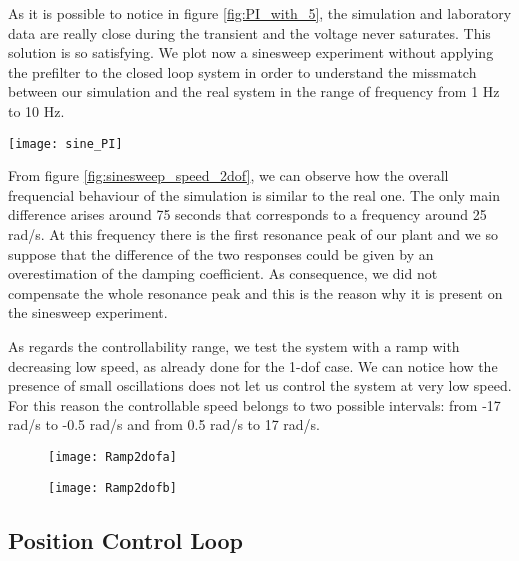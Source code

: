 As it is possible to notice in figure \ref{fig:PI_with_5}, the simulation and laboratory data are really close during the transient and the voltage never saturates. This solution is so satisfying. We plot now a sinesweep experiment without applying the prefilter to the closed loop system in order to understand the missmatch between our simulation and the real system in the range of frequency from 1 Hz to 10 Hz.

\begin{figure*}[h]
	\centering
	\texttt{[image: sine\_PI]}
	\caption{Sineweep experiment from 1 Hz to 10 Hz in 100s}
	\label{fig:sinesweep_speed_2dof}
\end{figure*}

From figure \ref{fig:sinesweep_speed_2dof}, we can observe how the overall frequencial behaviour of the simulation is similar to the real one. The only main difference arises around 75 seconds that corresponds to a frequency around 25 rad/s. At this frequency there is the first resonance peak of our plant and we so suppose that the difference of the two responses could be given by an overestimation of the damping coefficient. As consequence, we did not compensate the whole resonance peak and this is the reason why it is present on the sinesweep experiment.
\par
As regards the controllability range, we test the system with a ramp with decreasing low speed, as already done for the 1-dof case. We can notice how the presence of small oscillations does not let us control the system at very low speed. For this reason the controllable speed belongs to two possible intervals: from -17 rad/s to -0.5 rad/s and from 0.5 rad/s to 17 rad/s.
\begin{figure*}[h]
	\centering
	\begin{subfigure}{0.45\columnwidth}
		\texttt{[image: Ramp2dofa]}
	\end{subfigure}
	\begin{subfigure}{0.45\columnwidth}
		\texttt{[image: Ramp2dofb]}
	\end{subfigure}

	\caption{Ramp experiment from 17 rad/s to 0 rad/s in 100s}
	\label{fig:Ramp2dof}
\end{figure*}

\newpage
\subsection{Position Control Loop}

